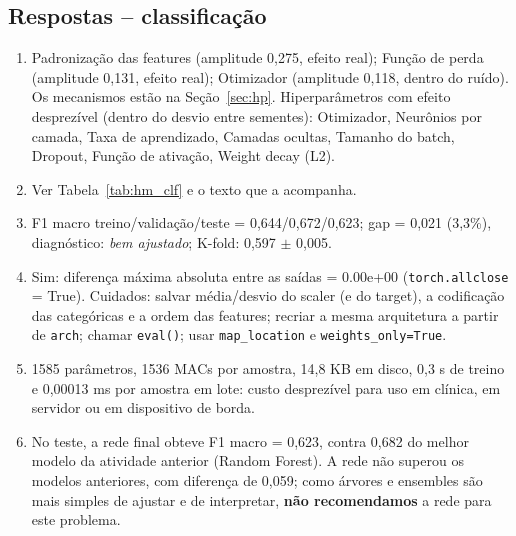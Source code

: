 \documentclass[11pt,a4paper]{article}
\begin{document}
\subsection{Respostas -- classificação}
\begin{enumerate}[label=(\alph*)]
\item Padronização das features (amplitude 0,275, efeito real); Função de perda (amplitude 0,131, efeito real); Otimizador (amplitude 0,118, dentro do ruído). Os mecanismos estão na Seção~\ref{sec:hp}. Hiperparâmetros com efeito desprezível (dentro do desvio entre sementes): Otimizador, Neurônios por camada, Taxa de aprendizado, Camadas ocultas, Tamanho do batch, Dropout, Função de ativação, Weight decay (L2). %
\item Ver Tabela~\ref{tab:hm_clf} e o texto que a acompanha.
\item F1 macro treino/validação/teste = 0,644/0,672/0,623; gap = 0,021 (3,3\%), diagnóstico: \emph{bem ajustado}; K-fold: 0,597 $\pm$ 0,005.
\item Sim: diferença máxima absoluta entre as saídas = 0.00e+00 (\texttt{torch.allclose} = True). Cuidados: salvar média/desvio do scaler (e do target), a codificação das categóricas e a ordem das features; recriar a mesma arquitetura a partir de \texttt{arch}; chamar \texttt{eval()}; usar \texttt{map\_location} e \texttt{weights\_only=True}.
\item 1585 parâmetros, 1536 MACs por amostra, 14,8 KB em disco, 0,3 s de treino e 0,00013 ms por amostra em lote: custo desprezível para uso em clínica, em servidor ou em dispositivo de borda. %
\item No teste, a rede final obteve F1 macro = 0,623, contra 0,682 do melhor modelo da atividade anterior (Random Forest). A rede não superou os modelos anteriores, com diferença de 0,059; como árvores e ensembles são mais simples de ajustar e de interpretar, \textbf{não recomendamos} a rede para este problema. %
\end{enumerate}
\end{document}
